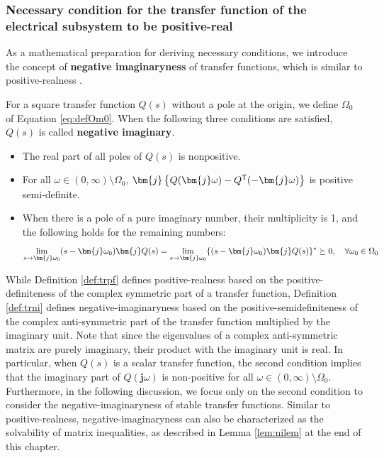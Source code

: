 \documentclass[graybox, envcountchap]{svmult}
\begin{document}
\smallskip
\subsubsection{Necessary condition for the transfer function of the electrical
subsystem to be positive-real}

As a mathematical preparation for deriving necessary conditions, we introduce
the concept of \textbf{negative imaginaryness} of
transfer functions, which is similar to positive-realness
\cite{petersen2010feedback,xiong2010negative}.

\begin{definition}
  \label{def:trni}
  For a square transfer function $Q(s)$ without a pole at the origin, we define $\Omega_0$ of Equation \ref{eq:defOm0}.
  When the following three conditions are satisfied, $Q(s)$ is called \textbf{negative imaginary}.
  \begin{itemize}
    \item The real part of all poles of $Q(s)$ is nonpositive.
    \item For all $\omega \in (0,\infty)\setminus \Omega_0$, $\bm{j}\left\{Q(\bm{j} \omega) - Q^{\sf T}(-\bm{j} \omega) \right\}$ is positive semi-definite.
    \item When there is a pole of a pure imaginary number, their multiplicity is 1, and the following holds for the remaining numbers:
    \begin{equation*}
      \lim_{s \rightarrow \bm{j} \omega_0} (s-\bm{j} \omega_0) \bm{j} Q(s) = 
      \lim_{s\rightarrow \bm{j} \omega_0} \{ (s-\bm{j} \omega_0) \bm{j} Q(s)\}^{\sf *}\succeq 0
      ,\quad
      \forall \omega_0 \in \Omega_0
    \end{equation*}
  \end{itemize}
\end{definition}

While Definition \ref{def:trpf} defines positive-realness based on the
positive-definiteness of the complex symmetric part of a transfer function,
Definition \ref{def:trni} defines negative-imaginaryness based on the
positive-semidefiniteness of the complex anti-symmetric part of the transfer
function multiplied by the imaginary unit. Note that since the eigenvalues of a
complex anti-symmetric matrix are purely imaginary, their product with the
imaginary unit is real. In particular, when $Q(s)$ is a scalar transfer
function, the second condition implies that the imaginary part of
$Q(\bm{j}\omega)$ is non-positive for all $\omega \in (0,\infty)\setminus
\Omega_0$. Furthermore, in the following discussion, we focus only on the second
condition to consider the negative-imaginaryness of stable transfer functions.
Similar to positive-realness, negative-imaginaryness can also be characterized
as the solvability of matrix inequalities, as described in Lemma \ref{lem:nilem}
at the end of this chapter.
\end{document}
